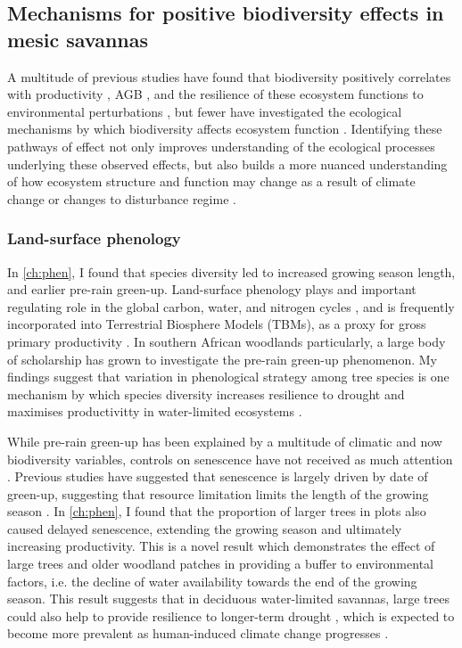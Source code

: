 \begin{refsection}
\subsection{Mechanisms for positive biodiversity effects in mesic savannas}
\label{discussion:ssec:mechanism}

A multitude of previous studies have found that biodiversity positively correlates with productivity \citep{}, AGB \citep{}, and the resilience of these ecosystem functions to environmental perturbations \citep{}, but fewer have investigated the ecological mechanisms by which biodiversity affects ecosystem function \citep{}. Identifying these pathways of effect not only improves understanding of the ecological processes underlying these observed effects, but also builds a more nuanced understanding of how ecosystem structure and function may change as a result of climate change or changes to disturbance regime \citep{}.

\subsubsection{Land-surface phenology}
\label{discussion:sssec:phen}

In \autoref{ch:phen}, I found that species diversity led to increased growing season length, and earlier pre-rain green-up. Land-surface phenology plays and important regulating role in the global carbon, water, and nitrogen cycles \citep{Richardson2013}, and is frequently incorporated into Terrestrial Biosphere Models (TBMs), as a proxy for gross primary productivity \citep{Bloom2016}. In southern African woodlands particularly, a large body of scholarship has grown to investigate the pre-rain green-up phenomenon. My findings suggest that variation in phenological strategy among tree species is one mechanism by which species diversity increases resilience to drought and maximises productivitty in water-limited ecosystems \citep{Stan2019, Morellato2016}. 

While pre-rain green-up has been explained by a multitude of climatic and now biodiversity variables, controls on senescence have not received as much attention \citep{}. Previous studies have suggested that senescence is largely driven by date of green-up, suggesting that resource limitation limits the length of the growing season \citep{Zani2020}. In \autoref{ch:phen}, I found that the proportion of larger trees in plots also caused delayed senescence, extending the growing season and ultimately increasing productivity. This is a novel result which demonstrates the effect of large trees and older woodland patches in providing a buffer to environmental factors, i.e. the decline of water availability towards the end of the growing season. This result suggests that in deciduous water-limited savannas, large trees could also help to provide resilience to longer-term drought \citep{}, which is expected to become more prevalent as human-induced climate change progresses \citep{}.


\end{refsection}
